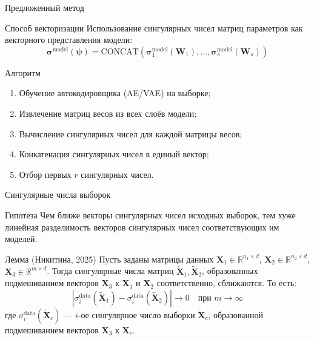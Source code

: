 \documentclass{beamer}
\begin{document}
\begin{frame}{Предложенный метод}
\begin{block}{Способ векторизации}
Использование сингулярных чисел матриц параметров как векторного представления модели:
\[
\boldsymbol{\sigma}^{\text{model}}(\boldsymbol{\psi}) = \text{CONCAT}(\boldsymbol{\sigma}_1^{\text{model}}(\mathbf{W}_1), \ldots, \boldsymbol{\sigma}_s^{\text{model}}(\mathbf{W}_s))
\]
\end{block}

\begin{block}{Алгоритм}
\begin{enumerate}
    \item Обучение автокодировщика (AE/VAE) на выборке;
    \item Извлечение матриц весов из всех слоёв модели;
    \item Вычисление сингулярных чисел для каждой матрицы весов;
    \item Конкатенация сингулярных чисел в единый вектор;
    \item Отбор первых $r$ сингулярных чисел.
\end{enumerate}
\end{block}
\end{frame}
\begin{frame}{Сингулярные числа выборок}
\begin{block}{Гипотеза}
Чем ближе векторы сингулярных чисел исходных выборок, тем хуже линейная разделимость векторов сингулярных чисел соответствующих им моделей.
\end{block}

\begin{block}{Лемма (Никитина, 2025)}
Пусть заданы матрицы данных $\mathbf{X}_1 \in \mathbb{R}^{n_1 \times d}$, $\mathbf{X}_2 \in \mathbb{R}^{n_2 \times d}$, $\mathbf{X}_3 \in \mathbb{R}^{m \times d}$. Тогда сингулярные числа матриц $\tilde{\mathbf{X}}_1, \tilde{\mathbf{X}}_2$, образованных подмешиванием векторов $\mathbf{X}_3$ к $\mathbf{X}_1$ и $\mathbf{X}_2$ соответственно, сближаются. То есть:
\[
|\sigma_i^{\text{data}}(\tilde{\mathbf{X}}_1) - \sigma_i^{\text{data}}(\tilde{\mathbf{X}}_2)| \longrightarrow 0 \quad \text{при } m \to \infty
\]
\noindent где $\sigma_i^{\text{data}}(\tilde{\mathbf{X}}_c)$ --- $i$-ое сингулярное число выборки $\tilde{\mathbf{X}}_c$, образованной подмешиванием векторов $\mathbf{X}_3$ к $\mathbf{X}_c$.
\end{block}
\end{frame}
\end{document}
